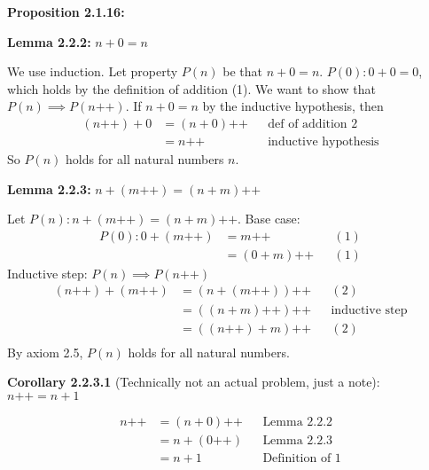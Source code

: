\documentclass[answers,12pt]{exam}
\newcommand{\increment}{\text{++}}
\begin{document}
\textbf{Proposition 2.1.16:}  

\begin{solution}

\end{solution}

\textbf{Lemma 2.2.2:}  $n+0=n$

\begin{solution}
We use induction.
Let property $P(n)$ be that $n+0=n$.
$P(0): 0+0=0$, which holds by the definition of addition (1).
We want to show that $P(n) \implies P(n \increment)$.
If $n+0=n$ by the inductive hypothesis, then 
\begin{align*}
    (n \increment) + 0 &= (n+0) \increment && \text{def of addition 2}\\
    &= n \increment && \text{inductive hypothesis}
\end{align*}
So $P(n)$ holds for all natural numbers $n$.
\end{solution}

\textbf{Lemma 2.2.3:}  $n+ (m \increment) = (n+m) \increment$

\begin{solution}
Let $P(n): n+ (m \increment) = (n+m) \increment$.
Base case: 
\begin{align*}
    P(0): 0+ (m \increment) &= m \increment && (1) \\
    &= (0 + m) \increment && (1)
\end{align*}
Inductive step: $P(n) \implies P(n \increment)$
\begin{align*}
    (n \increment) + (m \increment) &= (n+ (m \increment)) \increment && (2) \\
    &= ((n+m) \increment) \increment && \text{inductive step} \\
    &= ((n \increment) + m) \increment && (2) \\
\end{align*}
By axiom 2.5, $P(n)$ holds for all natural numbers.
\end{solution}

\textbf{Corollary 2.2.3.1} (Technically not an actual problem, just a note): $n \increment = n+1$

\begin{solution}
    \begin{align*}
        n \increment &= (n+0) \increment && \text{Lemma 2.2.2} \\
        &= n + (0 \increment) && \text{Lemma 2.2.3}\\
        &= n+1 && \text{Definition of 1}
    \end{align*}
\end{solution}
\end{document}
